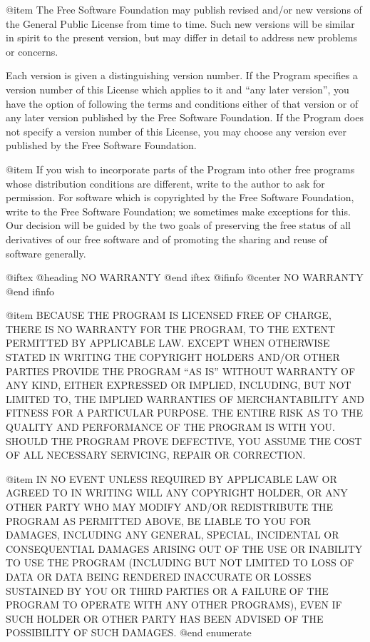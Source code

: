@item
The Free Software Foundation may publish revised and/or new versions
of the General Public License from time to time.  Such new versions will
be similar in spirit to the present version, but may differ in detail to
address new problems or concerns.

Each version is given a distinguishing version number.  If the Program
specifies a version number of this License which applies to it and ``any
later version'', you have the option of following the terms and conditions
either of that version or of any later version published by the Free
Software Foundation.  If the Program does not specify a version number of
this License, you may choose any version ever published by the Free Software
Foundation.

@item
If you wish to incorporate parts of the Program into other free
programs whose distribution conditions are different, write to the author
to ask for permission.  For software which is copyrighted by the Free
Software Foundation, write to the Free Software Foundation; we sometimes
make exceptions for this.  Our decision will be guided by the two goals
of preserving the free status of all derivatives of our free software and
of promoting the sharing and reuse of software generally.

@iftex
@heading NO WARRANTY
@end iftex
@ifinfo
@center NO WARRANTY
@end ifinfo

@item
BECAUSE THE PROGRAM IS LICENSED FREE OF CHARGE, THERE IS NO WARRANTY
FOR THE PROGRAM, TO THE EXTENT PERMITTED BY APPLICABLE LAW.  EXCEPT WHEN
OTHERWISE STATED IN WRITING THE COPYRIGHT HOLDERS AND/OR OTHER PARTIES
PROVIDE THE PROGRAM ``AS IS'' WITHOUT WARRANTY OF ANY KIND, EITHER EXPRESSED
OR IMPLIED, INCLUDING, BUT NOT LIMITED TO, THE IMPLIED WARRANTIES OF
MERCHANTABILITY AND FITNESS FOR A PARTICULAR PURPOSE.  THE ENTIRE RISK AS
TO THE QUALITY AND PERFORMANCE OF THE PROGRAM IS WITH YOU.  SHOULD THE
PROGRAM PROVE DEFECTIVE, YOU ASSUME THE COST OF ALL NECESSARY SERVICING,
REPAIR OR CORRECTION.

@item
IN NO EVENT UNLESS REQUIRED BY APPLICABLE LAW OR AGREED TO IN WRITING
WILL ANY COPYRIGHT HOLDER, OR ANY OTHER PARTY WHO MAY MODIFY AND/OR
REDISTRIBUTE THE PROGRAM AS PERMITTED ABOVE, BE LIABLE TO YOU FOR DAMAGES,
INCLUDING ANY GENERAL, SPECIAL, INCIDENTAL OR CONSEQUENTIAL DAMAGES ARISING
OUT OF THE USE OR INABILITY TO USE THE PROGRAM (INCLUDING BUT NOT LIMITED
TO LOSS OF DATA OR DATA BEING RENDERED INACCURATE OR LOSSES SUSTAINED BY
YOU OR THIRD PARTIES OR A FAILURE OF THE PROGRAM TO OPERATE WITH ANY OTHER
PROGRAMS), EVEN IF SUCH HOLDER OR OTHER PARTY HAS BEEN ADVISED OF THE
POSSIBILITY OF SUCH DAMAGES.
@end enumerate


